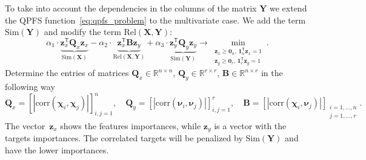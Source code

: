 \documentclass[12pt,oneside]{article}
\theoremstyle{definition}
\newcommand{\bz}{\mathbf{z}}
\newcommand{\bY}{\mathbf{Y}}
\newcommand{\bX}{\mathbf{X}}
\newcommand{\bB}{\mathbf{B}}
\newcommand{\bQ}{\mathbf{Q}}
\newcommand{\bbR}{\mathbb{R}}
\newcommand{\T}{\mathsf{T}}
\newcommand{\bchi}{\boldsymbol{\chi}}
\newcommand{\bnu}{\boldsymbol{\nu}}
\newcommand{\bOne}{\boldsymbol{1}}
\newcommand{\bZero}{\boldsymbol{0}}
\begin{document}
To take into account the dependencies in the columns of the matrix $\bY$ we extend the QPFS function~\eqref{eq:qpfs_problem} to the multivariate case.
We add the term~$\text{Sim}(\bY)$ and modify the term $\text{Rel}(\bX, \bY)$:
\begin{equation}
	\alpha_1 \cdot \underbrace{\bz_x^{\T} \bQ_x \bz_x}_{\text{Sim}(\bX)} - \alpha_2 \cdot \underbrace{\bz_x^{\T} \bB \bz_y}_{\text{Rel}(\bX, \bY)} + \alpha_3 \cdot \underbrace{\bz_y^{\T} \bQ_y \bz_y}_{\text{Sim}(\bY)} \rightarrow \min_{\substack{\bz_x \geq \bZero_n, \, \bOne_n^{\T}\bz_x=1 \\ \bz_y \geq \bZero_r, \, \bOne_r^{\T}\bz_y=1}}.
	\label{eq:multivariate_quadratic_problem}
\end{equation}
Determine the entries of matrices $\bQ_x \in \bbR^{n \times n}$, $\bQ_y \in \bbR^{r \times r}$, $\bB \in \bbR^{n \times r}$ in the following way
\begin{equation}
	\bQ_x = \left[ \left| \text{corr}(\bchi_i, \bchi_j) \right| \right]_{i,j=1}^n, \quad
	\bQ_y = \left[ \left| \text{corr}(\bnu_i, \bnu_j) \right| \right]_{i,j=1}^r, \quad
	\bB =  \left[ \left| \text{corr}(\bchi_i, \bnu_j) \right| \right]_{\substack{i=1, \dots, n \\ j=1, \dots, r}}.
\end{equation}
The vector~$\bz_x$ shows the features importances, while $\bz_y$ is a vector with the targets importances.
The correlated targets will be penalized by $\text{Sim} (\bY)$ and have the lower importances.
\end{document}
